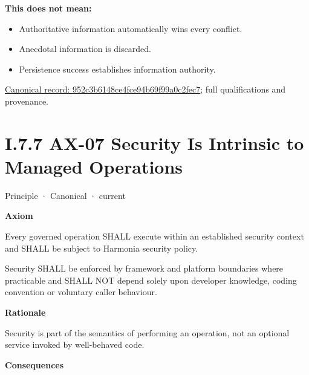 \textbf{This does not mean:}



\begin{itemize}


\item Authoritative information automatically wins every conflict.

\item Anecdotal information is discarded.

\item Persistence success establishes information authority.

\end{itemize}

{\footnotesize \href{../../../../../../../continuum/motivation/principle/952c3b6148ce4fce94b69f99a0c2fec7.md}{Canonical record: 952c3b6148ce4fce94b69f99a0c2fec7}; full qualifications and provenance.}\par
\section*{I.7.7 AX-07 Security Is Intrinsic to Managed Operations}
\label{navigation:I.7.7}

\label{element:5de2ae2c3b794c2d9f3a14efd51d564f}
{\small Principle · Canonical · current}\par

\par\medskip\textbf{Axiom}\par


Every governed operation SHALL execute within an established security
context and SHALL be subject to Harmonia security policy.



Security SHALL be enforced by framework and platform boundaries where
practicable and SHALL NOT depend solely upon developer knowledge, coding
convention or voluntary caller behaviour.



\par\medskip\textbf{Rationale}\par


Security is part of the semantics of performing an operation, not an
optional service invoked by well-behaved code.



\par\medskip\textbf{Consequences}\par



